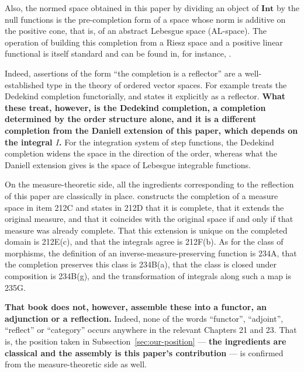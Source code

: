 Also, the normed space obtained in this paper by dividing an object of
$\mathbf{Int}$ by the null functions is the pre-completion form of a space whose
norm is additive on the positive cone, that is, of an abstract Lebesgue space
(AL-space).
The operation of building this completion from a Riesz space and a positive
linear functional is itself standard and can be found in, for instance,
\cite{AbramovichAliprantis}.

Indeed, assertions of the form ``the completion is a reflector'' are a
well-established type in the theory of ordered vector spaces.
For example \cite{BMO} treats the Dedekind completion functorially, and
\cite{AvilesBilokopytov} states it explicitly as a reflector.
\textbf{What these treat, however, is the Dedekind completion, a completion
determined by the order structure alone, and it is a different completion from
the Daniell extension of this paper, which depends on the integral $I$.}
For the integration system of step functions, the Dedekind completion widens the
space in the direction of the order, whereas what the Daniell extension gives is
the space of Lebesgue integrable functions.

On the measure-theoretic side, all the ingredients corresponding to the
reflection of this paper are classically in place.
\cite{FremlinMT2} constructs the completion of a measure space in item 212C and
states in 212D that it is complete, that it extends the original measure, and
that it coincides with the original space if and only if that measure was
already complete.
That this extension is unique on the completed domain is 212E(c), and that the
integrals agree is 212F(b).
As for the class of morphisms, the definition of an inverse-measure-preserving
function is 234A, that the completion preserves this class is 234B(a), that the
class is closed under composition is 234B(g), and the transformation of
integrals along such a map is 235G.

\textbf{That book does not, however, assemble these into a functor, an
adjunction or a reflection.}
Indeed, none of the words ``functor'', ``adjoint'', ``reflect'' or ``category''
occurs anywhere in the relevant Chapters 21 and 23.
That is, the position taken in
Subsection~\ref{sec:our-position} --- \textbf{the ingredients are classical and
the assembly is this paper's contribution} --- is confirmed from the
measure-theoretic side as well.

